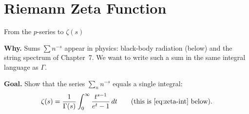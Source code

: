 \documentclass[11pt]{beamer}
\begin{document}
\section{Riemann Zeta Function}


\begin{frame}[allowframebreaks=1.00]{From the \(p\)-series to \(\zeta(s)\)}
\footnotesize

\textbf{Why.} Sums \(\sum n^{-s}\) appear in physics: black-body radiation (below) and
the string spectrum of Chapter~7. We want to write such a sum in the same integral language as
\(\Gamma\).

\textbf{Goal.} Show that the series \(\sum_n n^{-s}\) equals a single integral:
\[
 \zeta(s)=\frac1{\Gamma(s)}\int_0^\infty\frac{t^{s-1}}{e^t-1}\,dt
 \qquad(\text{this is \eqref{eq:zeta-int} below}).
\]


\end{frame}
\end{document}
